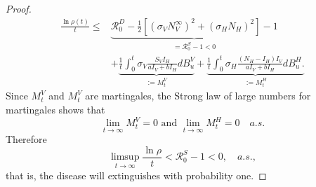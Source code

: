 \begin{proof}
\begin{equation}
\begin{aligned}
            \frac{
                \ln \rho(t)
            }{t}
            \leq &
                \underbrace{
                    \mathcal{R}_0 ^ D
                    -
                    \frac{1}{2}
                    \left [
                        \left(
                            \sigma_V N_V ^ \infty
                        \right) ^ 2
                        +
                        \left(
                            \sigma_H N_H
                        \right) ^2
                    \right ] - 1
                }_{=\mathcal{R}_0 ^ S - 1 < 0}
                \\
                & +
                \underbrace{
                    \frac{1}{t}
                    \int_{0}^{t}
                        \sigma_V 
                        \frac{S_V I_H}{a I_V + b I_H}
                    d B_u ^ V
               }_{:=M_t^V}
                +
               \underbrace{
                    \frac{1}{t}
                    \int_{0}^{t}
                        \sigma_H
                        \frac{(N_H - I_H) I_V}{a I_V + b I_H}
                    d B_u ^ H.
               }_{:= M_t ^ H}
        \end{aligned}
    \end{equation}
    Since $M_t^V$ and $M_t^V$ are martingales, the Strong law of large 
    numbers for martingales {\citet[p. 12, Thm. 3.4]{Mao2007}} shows that
    $$
        \lim_{t \to \infty}
            M_t^V = 0 \text{ and }
        \lim_{t \to \infty}
            M_t^H = 0 
        \quad a.s.
    $$    
    Therefore
    $$
        \limsup_{t \to \infty}
            \frac{\ln \rho}{t} <
            \mathcal{R}_0 ^ S - 1 < 0, \quad a.s.,
    $$
    that is, the disease will extinguishes with probability one.
\end{proof}
